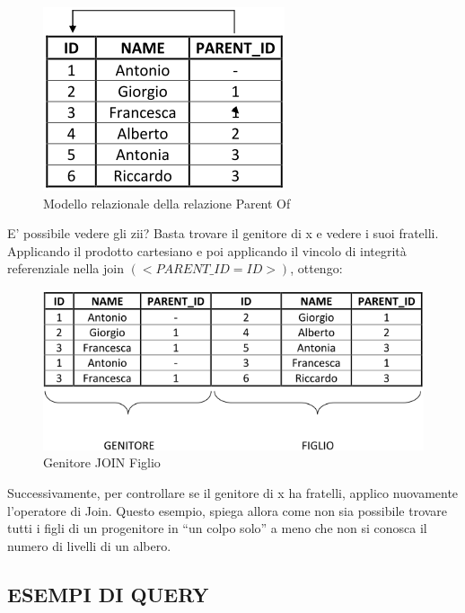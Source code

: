 \begin{center}
\begin{figure}[H]
\centering
\includegraphics[scale=1]{figures/parent_of_relational.png}
\caption{Modello relazionale della relazione Parent Of} 
\end{figure}
\end{center}

E’ possibile vedere gli zii? Basta trovare il genitore di x e vedere i suoi fratelli. 
Applicando il prodotto cartesiano e poi applicando il vincolo di integrità referenziale nella join $(<PARENT\_ID=ID>)$, ottengo: 

\begin{center}
\begin{figure}[H]
\centering
\includegraphics[scale=0.8]{figures/genitore_join_figlio.png}
\caption{Genitore JOIN Figlio} 
\end{figure}
\end{center}
	
Successivamente, per controllare se il genitore di x ha fratelli, applico nuovamente l’operatore di Join. 
Questo esempio, spiega allora come non sia possibile trovare tutti i figli di un progenitore in “un colpo solo” a meno che non si conosca il numero di livelli di un albero.  


\subsection{ESEMPI DI QUERY}

